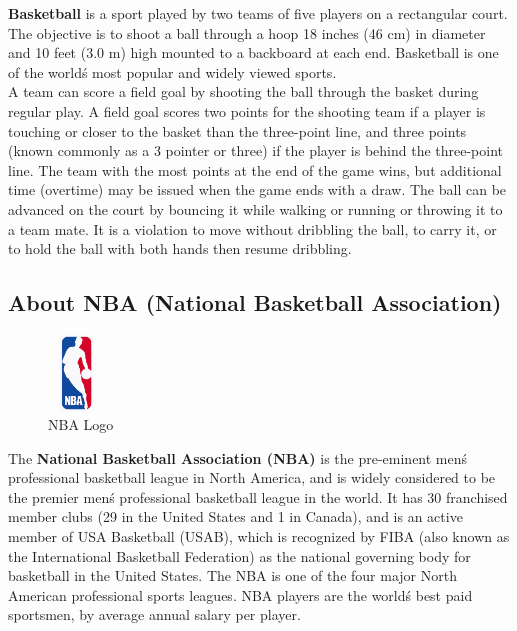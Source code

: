 \documentclass[a4paper]{article}
\begin{document}
\textbf{Basketball} is a sport played by two teams of five players on a rectangular court. The objective is to shoot a ball through a hoop 18 inches (46 cm) in diameter and 10 feet (3.0 m) high mounted to a backboard at each end. Basketball is one of the world\'s most popular and widely viewed sports.\\
A team can score a field goal by shooting the ball through the basket during regular play. A field goal scores two points for the shooting team if a player is touching or closer to the basket than the three-point line, and three points (known commonly as a 3 pointer or three) if the player is behind the three-point line. The team with the most points at the end of the game wins, but additional time (overtime) may be issued when the game ends with a draw. The ball can be advanced on the court by bouncing it while walking or running or throwing it to a team mate. It is a violation to move without dribbling the ball, to carry it, or to hold the ball with both hands then resume dribbling. 

\vspace{1cm}

\subsection{About NBA (National Basketball Association)}
\vspace{1cm}

\begin{figure}[ht]
\begin{center}
\includegraphics[width=1.5cm,height=2cm]{NBALogo.png}
\end{center}
\caption{NBA Logo}
\label{Img:NBALogo}
\end{figure}
\vspace{1cm}
The \textbf{National Basketball Association (NBA)} is the pre-eminent men\'s professional basketball league in North America, and is widely considered to be the premier men\'s professional basketball league in the world. It has 30 franchised member clubs (29 in the United States and 1 in Canada), and is an active member of USA Basketball (USAB), which is recognized by FIBA (also known as the International Basketball Federation) as the national governing body for basketball in the United States. The NBA is one of the four major North American professional sports leagues. NBA players are the world\'s best paid sportsmen, by average annual salary per player.
\vspace{1cm}
\end{document}
